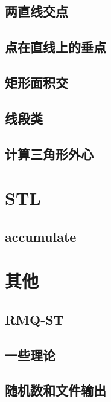 \documentclass{ctexart}
\begin{document}
\subsection{两直线交点}

\subsection{点在直线上的垂点}

\subsection{矩形面积交}

\subsection{线段类}

\subsection{计算三角形外心}



\section{STL}
\subsection{accumulate}




\section{其他}
\subsection{RMQ-ST}

\subsection{一些理论}

\subsection{随机数和文件输出}

\end{document}
